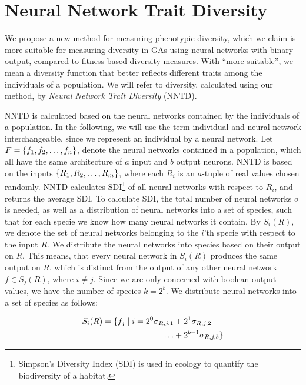 \section{Neural Network Trait Diversity}
We propose a new method for measuring phenotypic diversity, which we claim is more suitable for measuring diversity in GAs using neural networks with binary output, compared to fitness based diversity measures. With ``more suitable'', we mean a diversity function that better reflects different traits among the individuals of a population. We will refer to diversity, calculated using our method, by \emph{Neural Network Trait Diversity} (NNTD).

NNTD is calculated based on the neural networks contained by the individuals of a population. 
In the following, we will use the term individual and neural network interchangeable, since we represent an individual by a neural network. 
Let $F = \{ f_1, f_2, \dots, f_n \}$, denote the neural networks contained in a population, which all have the same architecture of $a$ input and $b$ output neurons. 
NNTD is based on the inputs $\{ R_1, R_2, \dots, R_m \}$, where each $R_i$ is an $a$-tuple of real values chosen randomly.
NNTD calculates SDI\footnote{Simpson's Diversity Index (SDI) is used in ecology to quantify the biodiversity of a habitat.} of all neural networks with respect to $R_i$, and returns the average SDI.
To calculate SDI, the total number of neural networks $o$ is needed, as well as a distribution of neural networks into a set of species, such that for each specie we know how many neural networks it contain.
By $S_i(R)$, we denote the set of neural networks belonging to the $i$'th specie with respect to the input $R$.
We distribute the neural networks into species based on their output on $R$. This means, that every neural network in $S_i(R)$ produces the same output on $R$, which is distinct from the output of any other neural network $f \in S_j(R)$, where $i \neq j$.
Since we are only concerned with boolean output values, we have the number of species $k = 2^b$. 
We distribute neural networks into a set of species as follows:

\begin{equation}\label{eq:species}
  \begin{split}
    S_i(R) = \{ f_j \mid i = 2^0\sigma_{R,j,1} & + 2^1\sigma_{R,j,2}\; + \\
  \dots & + 2^{b-1}\sigma_{R,j,b} \}
  \end{split}
\end{equation}

